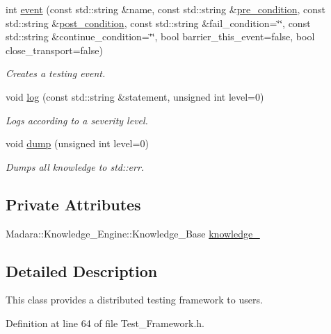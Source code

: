 \begin{DoxyCompactItemize}
int \hyperlink{classMadara_1_1KATS_1_1Test__Framework_abf584ae450a64c34967ccef00e98159e}{event} (const std::string \&name, const std::string \&\hyperlink{Sleep_8cpp_a8dbeacb5625fe0926dda02ea9b2a0c14}{pre\_\-condition}, const std::string \&\hyperlink{Sleep_8cpp_a58e2278c84957abc753d55d193f28ee5}{post\_\-condition}, const std::string \&fail\_\-condition=\char`\"{}\char`\"{}, const std::string \&continue\_\-condition=\char`\"{}\char`\"{}, bool barrier\_\-this\_\-event=false, bool close\_\-transport=false)
\begin{DoxyCompactList}\small\item\em Creates a testing event. \item\end{DoxyCompactList}\item 
void \hyperlink{classMadara_1_1KATS_1_1Test__Framework_a5d82e363fe117b9290c31c7a52a9cbd8}{log} (const std::string \&statement, unsigned int level=0)
\begin{DoxyCompactList}\small\item\em Logs according to a severity level. \item\end{DoxyCompactList}\item 
void \hyperlink{classMadara_1_1KATS_1_1Test__Framework_a0eaea19ab8222ae540dc4dcfe58c188c}{dump} (unsigned int level=0)
\begin{DoxyCompactList}\small\item\em Dumps all knowledge to std::err. \item\end{DoxyCompactList}\end{DoxyCompactItemize}
\subsection*{Private Attributes}
\begin{DoxyCompactItemize}
\item 
Madara::Knowledge\_\-Engine::Knowledge\_\-Base \hyperlink{classMadara_1_1KATS_1_1Test__Framework_a0459ab8366a35c7122770e331c22d416}{knowledge\_\-}
\end{DoxyCompactItemize}


\subsection{Detailed Description}
This class provides a distributed testing framework to users. 

Definition at line 64 of file Test\_\-Framework.h.



